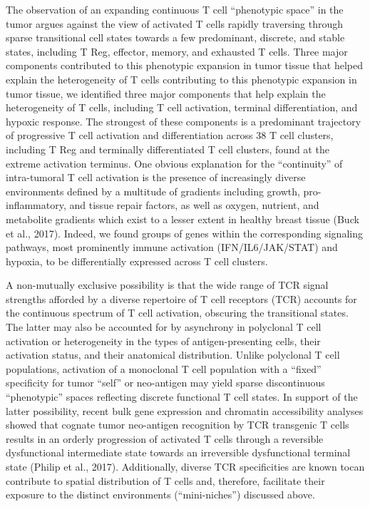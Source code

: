 The observation of an expanding continuous T cell ``phenotypic space'' in the tumor argues against the view of activated T cells rapidly traversing through sparse transitional cell states towards a few predominant, discrete, and stable states, including T Reg, effector, memory, and exhausted T cells. 
Three major components contributed to this phenotypic expansion in tumor tissue that helped explain the heterogeneity of T cells contributing to this phenotypic expansion in tumor tissue, we identified three major components that help explain the heterogeneity of T cells, including T cell activation, terminal differentiation, and hypoxic response. 
The strongest of these components is a predominant trajectory of progressive T cell activation and differentiation across 38 T cell clusters, including T Reg and terminally differentiated T cell clusters, found at the extreme activation terminus. 
One obvious explanation for the ``continuity'' of intra-tumoral T cell activation is the presence of increasingly diverse environments defined by a multitude of gradients including growth, pro-inflammatory, and tissue repair factors, as well as oxygen, nutrient, and metabolite gradients which exist to a lesser extent in healthy breast tissue (Buck et al., 2017).  %
Indeed, we found groups of genes within the corresponding signaling pathways, most prominently immune activation (IFN/IL6/JAK/STAT) and hypoxia, to be differentially expressed across T cell clusters.

A non-mutually exclusive possibility is that the wide range of TCR signal strengths afforded by a diverse repertoire of T cell receptors (TCR) accounts for the continuous spectrum of T cell activation, obscuring the transitional states. 
The latter may also be accounted for by asynchrony in polyclonal T cell activation or heterogeneity in the types of antigen-presenting cells, their activation status, and their anatomical distribution. 
Unlike polyclonal T cell populations, activation of a monoclonal T cell population with a ``fixed'' specificity for tumor ``self'' or neo-antigen may yield sparse discontinuous ``phenotypic'' spaces reflecting discrete functional T cell states. 
In support of the latter possibility, recent bulk gene expression and chromatin accessibility analyses showed that cognate tumor neo-antigen recognition by TCR transgenic T cells results in an orderly progression of activated T cells through a reversible dysfunctional intermediate state towards an irreversible dysfunctional terminal state (Philip et al., 2017). %
Additionally, diverse TCR specificities are known tocan contribute to spatial distribution of T cells and, therefore, facilitate their exposure to the distinct environments (``mini-niches'') discussed above. 

